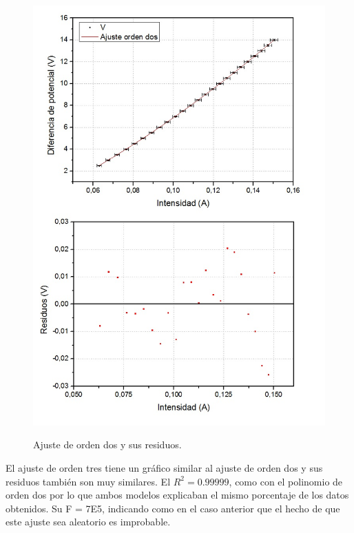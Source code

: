 \documentclass[twoside,twocolumn,a4paper]{article}
\begin{document}
\begin{figure}[h]
\includegraphics[width=\linewidth]{fig_o2.jpg}
\label{fig_o2}
\caption{Ajuste de orden dos y sus residuos.}
\end{figure}



El ajuste de orden tres tiene un gr\'afico similar al ajuste de orden dos y sus residuos tambi\'en son muy similares. El $R^2=0.99999$, como con el polinomio de orden dos por lo que ambos modelos explicaban el mismo porcentaje de los datos obtenidos. Su F = 7E5, indicando como en el caso anterior que el hecho de que este ajuste sea aleatorio es improbable.\par
\end{document}
